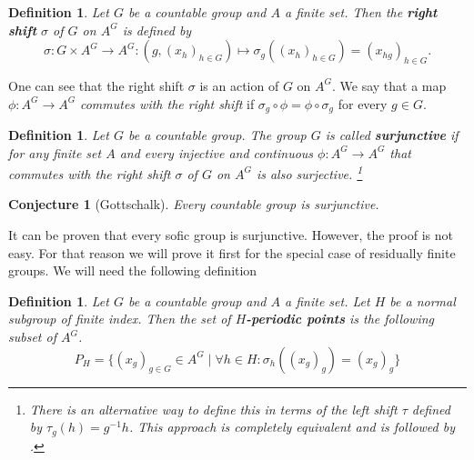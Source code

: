 \documentclass[titlepage, a4paper]{article}
\newtheorem{definition}[theorem]{Definition}
\newtheorem{conjecture}[theorem]{Conjecture}
\theoremstyle{remark}
\begin{document}
    \begin{definition}
	    Let $G$ be a countable group and $A$ a finite set. Then the \textbf{right shift} $\sigma$ of $G$ on $A^G$ is defined by
        \[
        \sigma: G \times A^G \to A^G: \left(g, (x_{h})_{h \in G} \right) \mapsto \sigma_g((x_{h})_{h \in G}) = \left( x_{hg} \right)_{h \in G}.
        \]
    \end{definition}

    One can see that the right shift $\sigma$ is an action of $G$ on $A^G$. We say that a map $\phi: A^G \to A^G$ \emph{commutes with the right shift} if $\sigma_g \circ \phi = \phi \circ \sigma_g$ for every $g \in G$.
    
    \begin{definition}
	    Let $G$ be a countable group. The group $G$ is called \textbf{surjunctive} if for any finite set $A$ and every injective and continuous $\phi: A^{G}\to A^{G}$ that commutes with the right shift $\sigma$ of $G$ on $A^G$ is also surjective.
	    \footnote{There is an alternative way to define this in terms of the \emph{left shift} $\tau$ defined by $\tau_g(h)= g^{-1}h$. This approach is completely equivalent and is followed by \cite{capraro_lupini_2015}.}
    \end{definition} 


    \begin{conjecture}[Gottschalk] \label{conj:gottschalk}
        Every countable group is surjunctive.
    \end{conjecture}

    It can be proven that every sofic group is surjunctive. However, the proof is not easy. For that reason we will prove it first for the special case of residually finite groups. We will need the following definition
\begin{definition}
    Let $G$ be a countable group and $A$ a finite set. Let $H$ be a normal subgroup of finite index. Then the set of \textbf{$H$-periodic points} is the following subset of $A^G$.
        \[
        P_H = \{ (x_g)_{g \in G} \in A^G  \mid \forall h \in H: \sigma_h((x_g)_g) = (x_g)_g\}
        \]
\end{definition}

\end{document}
